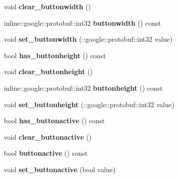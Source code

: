 \begin{DoxyCompactItemize}
\item 
\hypertarget{class_game_menu_a530076caa9483b223c89ba806f1ab996}{void {\bfseries clear\-\_\-buttonwidth} ()}\label{class_game_menu_a530076caa9483b223c89ba806f1ab996}

\item 
\hypertarget{class_game_menu_a129d9ca0747a44437f0bb7181cd92fba}{inline\-::google\-::protobuf\-::int32 {\bfseries buttonwidth} () const }\label{class_game_menu_a129d9ca0747a44437f0bb7181cd92fba}

\item 
\hypertarget{class_game_menu_a56aa7ceffcc93eb338206c82127b7f62}{void {\bfseries set\-\_\-buttonwidth} (\-::google\-::protobuf\-::int32 value)}\label{class_game_menu_a56aa7ceffcc93eb338206c82127b7f62}

\item 
\hypertarget{class_game_menu_a5f109f581d3786a458d156260a2acb84}{bool {\bfseries has\-\_\-buttonheight} () const }\label{class_game_menu_a5f109f581d3786a458d156260a2acb84}

\item 
\hypertarget{class_game_menu_a9d6ca35aac1c8addef27536bb63c691f}{void {\bfseries clear\-\_\-buttonheight} ()}\label{class_game_menu_a9d6ca35aac1c8addef27536bb63c691f}

\item 
\hypertarget{class_game_menu_a0d6c040f3b994ab558e2d2dbc11fcef0}{inline\-::google\-::protobuf\-::int32 {\bfseries buttonheight} () const }\label{class_game_menu_a0d6c040f3b994ab558e2d2dbc11fcef0}

\item 
\hypertarget{class_game_menu_ae1aa83ed7078237a0914bcd24964d446}{void {\bfseries set\-\_\-buttonheight} (\-::google\-::protobuf\-::int32 value)}\label{class_game_menu_ae1aa83ed7078237a0914bcd24964d446}

\item 
\hypertarget{class_game_menu_a28214c378a1acdefc8d85d8dd360939b}{bool {\bfseries has\-\_\-buttonactive} () const }\label{class_game_menu_a28214c378a1acdefc8d85d8dd360939b}

\item 
\hypertarget{class_game_menu_a95b04ee1a6c6677bb225c3797d9d8061}{void {\bfseries clear\-\_\-buttonactive} ()}\label{class_game_menu_a95b04ee1a6c6677bb225c3797d9d8061}

\item 
\hypertarget{class_game_menu_ac53f3dde12a642d330498c33ecb1386f}{bool {\bfseries buttonactive} () const }\label{class_game_menu_ac53f3dde12a642d330498c33ecb1386f}

\item 
\hypertarget{class_game_menu_af3fe74b06fabc19c5df391917ace597b}{void {\bfseries set\-\_\-buttonactive} (bool value)}\label{class_game_menu_af3fe74b06fabc19c5df391917ace597b}

\end{DoxyCompactItemize}
